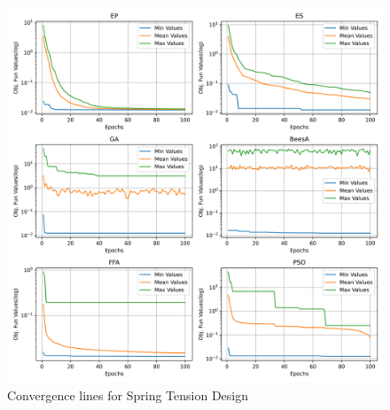 
\begin{figure}[H]
\centering
\caption{Convergence lines for Spring Tension Design}
\label{fig:spring_problem_convergence}
\includegraphics[width= 0.4 \textwidth]{images/spring_problem_convergence.png}
\end{figure}
    